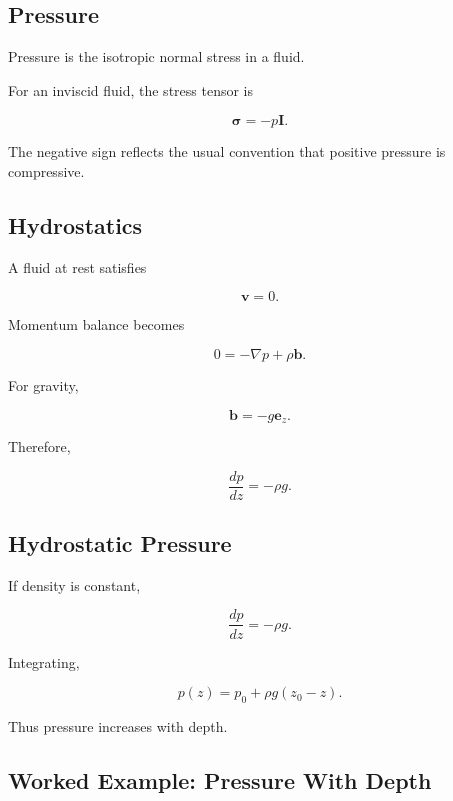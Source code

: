 \subsection{Pressure}
\label{subsec:fluid-pressure}

Pressure is the isotropic normal stress in a fluid.

For an inviscid fluid, the stress tensor is

\[
\boxed{
\boldsymbol{\sigma}
=
-p\mathbf{I}.
}
\]

The negative sign reflects the usual convention that positive pressure is
compressive.

\subsection{Hydrostatics}
\label{subsec:hydrostatics}

A fluid at rest satisfies

\[
\mathbf{v}=0.
\]

Momentum balance becomes

\[
\boxed{
0
=
-\nabla p
+
\rho\mathbf{b}.
}
\]

For gravity,

\[
\mathbf{b}
=
-g\mathbf{e}_z.
\]

Therefore,

\[
\boxed{
\frac{dp}{dz}
=
-\rho g.
}
\]

\subsection{Hydrostatic Pressure}
\label{subsec:hydrostatic-pressure}

If density is constant,

\[
\frac{dp}{dz}
=
-\rho g.
\]

Integrating,

\[
\boxed{
p(z)
=
p_0
+
\rho g(z_0-z).
}
\]

Thus pressure increases with depth.

\subsection{Worked Example: Pressure With Depth}
\label{subsec:worked-pressure-depth}

